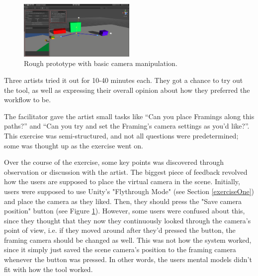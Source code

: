 \begin{figure}[htbp]
\centering
\includegraphics[width=0.50\textwidth]{Pics/MainSetup}
\caption{Rough prototype with basic camera manipulation.}
\label{fig:prototype}
\end{figure}

Three artists tried it out for 10-40 minutes each. They got a chance to try out the tool, as well as expressing their overall opinion about how they preferred the workflow to be.


The facilitator gave the artist small tasks like “Can you place Framings along this paths?” and “Can you try and set the Framing’s camera settings as you’d like?”. This exercise was semi-structured, and not all questions were predetermined; some was thought up as the exercise went on.

Over the course of the exercise, some key points was discovered through observation or discussion with the artist. The biggest piece of feedback revolved how the users are supposed to place the virtual camera in the scene. Initially, users were supposed to use Unity’s "Flythrough Mode" (see Section \ref{exerciseOne}) and place the camera as they liked. Then, they should press the "Save camera position" button (see Figure \ref{fig:prototype}). However, some users were confused about this, since they thought that they now they continuously looked through the camera's point of view, i.e. if they moved around after they'd pressed the button, the framing camera should be changed as well. This was not how the system worked, since it simply just saved the scene camera's position to the framing camera whenever the button was pressed. In other words, the users mental models didn't fit with how the tool worked.
